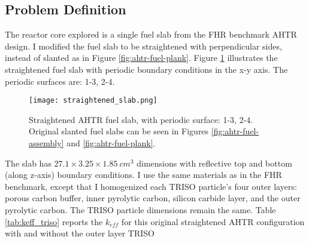 \subsection{Problem Definition}
The reactor core explored is a single fuel slab from the \gls{FHR} benchmark
\gls{AHTR} design.
I modified the fuel slab to be straightened with perpendicular sides, instead 
of slanted as in Figure \ref{fig:ahtr-fuel-plank}. 
Figure \ref{fig:straightened_slab} illustrates the straightened fuel slab with 
periodic boundary conditions in the x-y axis. 
The periodic surfaces are: 1-3, 2-4. 
\begin{figure}[]
    \centering
    \texttt{[image: straightened\_slab.png]}
    \raggedright
    \caption{Straightened \acrfull{AHTR} fuel slab, with periodic surface: 1-3, 2-4. 
    Original slanted fuel slabs can be seen in Figures \ref{fig:ahtr-fuel-assembly} 
    and \ref{fig:ahtr-fuel-plank}.}
    \label{fig:straightened_slab}
\end{figure}
The slab has $27.1 \times 3.25 \times 1.85\ cm^3$ dimensions with reflective 
top and bottom (along z-axis) boundary conditions.
I use the same materials as in the \gls{FHR} benchmark, except that I homogenized 
each \gls{TRISO} particle's four outer layers: 
porous carbon buffer, inner pyrolytic carbon, silicon carbide layer, and the 
outer pyrolytic carbon. 
The \gls{TRISO} particle dimensions remain the same.
Table \ref{tab:keff_triso} reports the $k_{eff}$ for this original straightened 
\gls{AHTR} configuration with and without the outer layer \gls{TRISO} 

